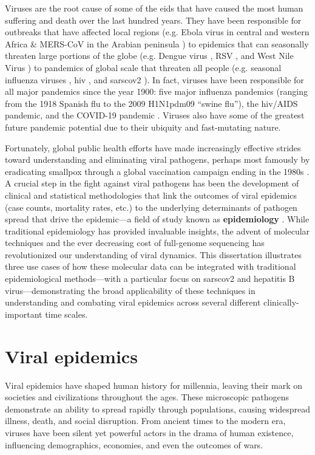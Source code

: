 Viruses are the root cause of some of the \gls{eid}s that have caused the most human suffering and death over the last hundred years.
They have been responsible for outbreaks that have affected local regions (e.g. Ebola virus in central and western Africa \citep{dudas2017virus} \& MERS-CoV in the Arabian peninsula \citep{dudas2018mers-cov}) to epidemics that can seasonally threaten large portions of the globe (e.g. Dengue virus \citep{ross2010dengue}, RSV \citep{welliver2003review}, and West Nile Virus \citep{hadfield2019twenty}) to pandemics of global scale that threaten all people (e.g. seasonal influenza viruses \citep{hsieh2006influenza,lina2008history}, \gls{hiv} \citep{merson2008history}, and \gls{sarscov2} \citep{Andersen2020}).
In fact, viruses have been responsible for all major pandemics since the year 1900: five major influenza pandemics (ranging from the 1918 Spanish flu to the 2009 H1N1pdm09 ``swine flu''), the \gls{hiv}/AIDS pandemic, and the COVID-19 pandemic \citep{roychoudhury2021viral,piret2021pandemics}.
Viruses also have some of the greatest future pandemic potential due to their ubiquity and fast-mutating nature.

Fortunately, global public health efforts have made increasingly effective strides toward understanding and eliminating viral pathogens, perhaps most famously by eradicating smallpox through a global vaccination campaign ending in the 1980s \citep{fenner1982global,henderson2011eradication}.
A crucial step in the fight against viral pathogens has been the development of clinical and statistical methodologies that link the outcomes of viral epidemics (case counts, mortality rates, etc.) to the underlying determinants of pathogen spread that drive the epidemic---a field of study known as \textbf{epidemiology} \citep{rothman2024epidemiology}.
While traditional epidemiology has provided invaluable insights, the advent of molecular techniques \citep{gilchrist2015whole} and the ever decreasing cost of full-genome sequencing \citep{sboner2011real,mardis2017dna} has revolutionized our understanding of viral dynamics.
This dissertation illustrates three use cases of how these molecular data can be integrated with traditional epidemiological methods---with a particular focus on \gls{sarscov2} and hepatitis B virus---demonstrating the broad applicability of these techniques in understanding and combating viral epidemics across several different clinically-important time scales.

\section{Viral epidemics}\label{sec:int-viralEpi}
Viral epidemics have shaped human history for millennia, leaving their mark on societies and civilizations throughout the ages.
These microscopic pathogens demonstrate an ability to spread rapidly through populations, causing widespread illness, death, and social disruption.
From ancient times to the modern era, viruses have been silent yet powerful actors in the drama of human existence, influencing demographics, economies, and even the outcomes of wars.

